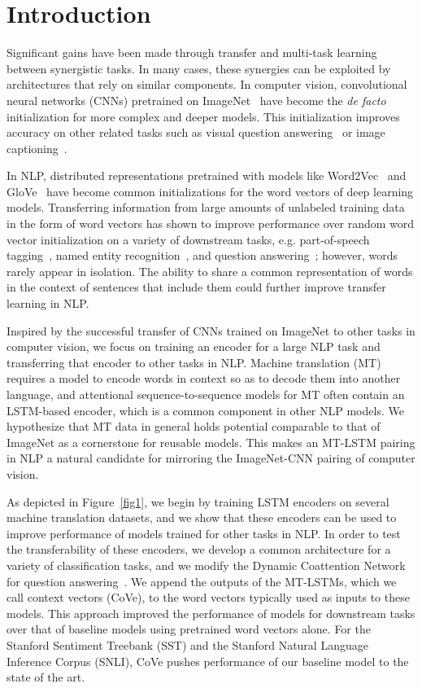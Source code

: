 \section{Introduction}

Significant gains have been made through transfer and multi-task learning between synergistic tasks.
In many cases, these synergies can be exploited by architectures that rely on similar components. 
In computer vision, convolutional neural networks (CNNs) pretrained on ImageNet~\citep{krizhevsky2012imagenet, Deng2009ImageNetAL} have become the \textit{de facto} initialization for more complex and deeper models. 
This initialization improves accuracy on other related tasks such as visual question answering~\citep{xiong2016dynamic} or image captioning~\citep{lu2016knowing, Socher2014TACL}.

In NLP, distributed representations pretrained with models like Word2Vec~\citep{Mikolov2013b} and GloVe~\citep{Pennington2014} have become common initializations for the word vectors of deep learning models. 
Transferring information from large amounts of unlabeled training data in the form of word vectors has shown to improve performance over random word vector initialization on a variety of downstream tasks, 
e.g. part-of-speech tagging~\citep{Collobert2011}, named entity recognition~\citep{Pennington2014}, and question answering~\citep{Xiong2017};
however, words rarely appear in isolation.
The ability to share a common representation of words in the context of sentences that include them could further improve transfer learning in NLP.

Inspired by the successful transfer of CNNs trained on ImageNet to other tasks in computer vision,
we focus on training an encoder for a large NLP task and transferring that encoder to other tasks in NLP.
Machine translation (MT) requires a model to encode words in context so as to decode them into another language,
and attentional sequence-to-sequence models for MT often contain an LSTM-based encoder, 
which is a common component in other NLP models.
We hypothesize that MT data in general holds potential
comparable to that of ImageNet 
as a cornerstone for reusable models.
This makes an MT-LSTM pairing in NLP a natural candidate for mirroring the ImageNet-CNN pairing of computer vision.

As depicted in Figure~\ref{fig1}, 
we begin by training LSTM encoders on several machine translation datasets, 
and we show that these encoders can be used to improve performance of models trained for other tasks in NLP.
In order to test the transferability of these encoders, 
we develop a common architecture for a variety of classification tasks,
and we modify the Dynamic Coattention Network for question answering~\citep{Xiong2017}.
We append the outputs of the MT-LSTMs, 
which we call context vectors (CoVe), 
to the word vectors typically used as inputs to these models.
This approach improved the performance of models for downstream tasks over that of baseline models using pretrained word vectors alone.
For the Stanford Sentiment Treebank (SST) and the Stanford Natural Language Inference Corpus (SNLI),
CoVe pushes performance of our baseline model to the state of the art.


